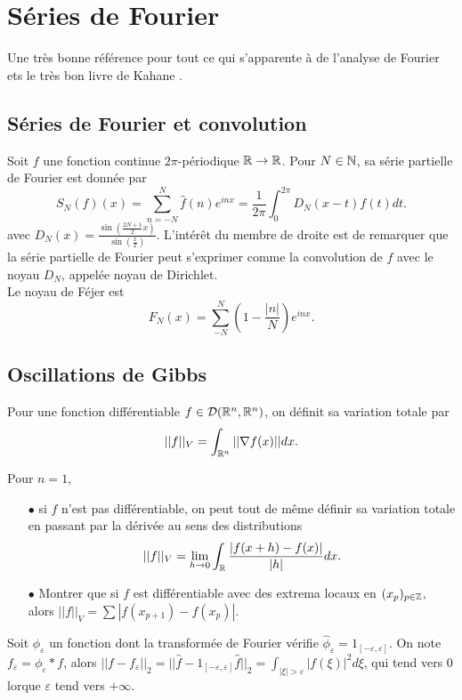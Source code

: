 \section{Séries de Fourier}

Une très bonne référence pour tout ce qui s'apparente à de l'analyse de Fourier ets le très bon livre de Kahane \cite{kahane}.

\subsection{Séries de Fourier et convolution}

Soit $f$ une fonction continue $2\pi$-périodique $\mathbb R\rightarrow \mathbb R$. Pour $N\in\mathbb N$, sa série partielle de Fourier est donnée par 
\[S_N(f)(x)=\sum_{n=-N}^{N} \hat f(n) e^{inx} = \frac{1}{2\pi}\int_0^{2\pi}D_N(x-t)f(t)dt.\]
avec $D_N(x)=\frac{\sin(\frac{2N+1}{2}x)}{\sin(\frac{x}{2})}$. L'intérêt du membre de droite est de remarquer que la série partielle de Fourier peut s'exprimer comme la convolution de $f$ avec le noyau $D_N$, appelée noyau de Dirichlet.\\  

Le noyau de Féjer est \[F_N(x)=\sum_{-N}^N (1-\frac{|n|}{N})e^{inx}.\]
\subsection{Oscillations de Gibbs}

Pour une fonction différentiable $f\in \mathcal D(\mathbb R^n,\mathbb R^n)$, on définit sa variation totale par 
\[||f||_V=\int_{\mathbb R^n} ||\nabla f(x)||dx.\]

\begin{rk}Pour $n=1$, \\
\begin{itemize}
\item[$\bullet$] si $f$ n'est pas différentiable, on peut tout de même définir sa variation totale en passant par la dérivée au sens des distributions
\[||f||_V=\lim_{h\rightarrow 0}\int_{\mathbb R} \frac{|f(x+h)-f(x)|}{|h|}dx.\]
\item[$\bullet$] Montrer que si $f$ est différentiable avec des extrema locaux en $(x_p)_{p\in \mathbb Z}$, alors $||f||_V=\sum |f(x_{p+1})-f(x_p)|$.
\end{itemize}\end{rk}

Soit $\phi_\varepsilon$ un fonction dont la transformée de Fourier vérifie $\hat\phi_\varepsilon=1_[-\varepsilon,\varepsilon]$. On note $f_\varepsilon= \phi_\varepsilon \ast f$, alors $||f-f_\varepsilon||_2=||\hat f-1_[-\varepsilon,\varepsilon]\hat f||_2=\int_{|\xi|>\varepsilon} |f(\xi)|^2 d\xi $, qui tend vers $0$ lorque $\varepsilon$ tend vers $+\infty$.\\

